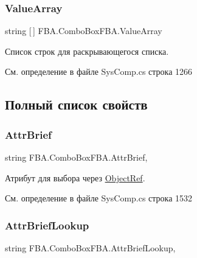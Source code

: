 \subsubsection{\texorpdfstring{Value\+Array}{ValueArray}}
{\footnotesize\ttfamily string \mbox{[}$\,$\mbox{]} F\+B\+A.\+Combo\+Box\+F\+B\+A.\+Value\+Array}



Список строк для раскрывающегося списка. 



См. определение в файле Sys\+Comp.\+cs строка 1266



\subsection{Полный список свойств}
\mbox{\label{class_f_b_a_1_1_combo_box_f_b_a_a444901726d55937c248fc4ebceb9fd56}} 
\subsubsection{\texorpdfstring{Attr\+Brief}{AttrBrief}}
{\footnotesize\ttfamily string F\+B\+A.\+Combo\+Box\+F\+B\+A.\+Attr\+Brief\hspace{0.3cm}{\ttfamily [get]}, {\ttfamily [set]}}



Атрибут для выбора через \mbox{\hyperlink{class_f_b_a_1_1_object_ref}{Object\+Ref}}. 



См. определение в файле Sys\+Comp.\+cs строка 1532

\mbox{\label{class_f_b_a_1_1_combo_box_f_b_a_ae767858bf456b75c5e5debf6817afa9b}} 
\subsubsection{\texorpdfstring{Attr\+Brief\+Lookup}{AttrBriefLookup}}
{\footnotesize\ttfamily string F\+B\+A.\+Combo\+Box\+F\+B\+A.\+Attr\+Brief\+Lookup\hspace{0.3cm}{\ttfamily [get]}, {\ttfamily [set]}}



